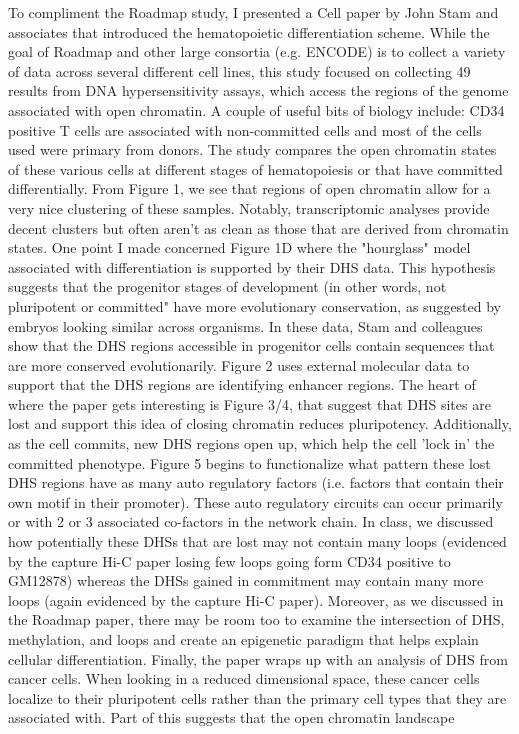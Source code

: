 \documentclass[12pt]{article}
\begin{document}
\begin{addmargin}[6.5mm]{4mm}  
To compliment the Roadmap study, I presented a Cell paper by John Stam and associates that introduced the hematopoietic differentiation scheme. While the goal of Roadmap and other large consortia (e.g. ENCODE) is to collect a variety of data across several different cell lines, this study focused on collecting 49 results from DNA hypersensitivity assays, which access the regions of the genome associated with open chromatin. A couple of useful bits of biology include: CD34 positive T cells are associated with non-committed cells and most of the cells used were primary from donors. The study compares the open chromatin states of these various cells at different stages of hematopoiesis or that have committed differentially. From Figure 1, we see that regions of open chromatin allow for a very nice clustering of these samples. Notably, transcriptomic analyses provide decent clusters but often aren't as clean as those that are derived from chromatin states.  \newline \newline One point I made concerned Figure 1D where the "hourglass" model associated with differentiation is supported by their DHS data. This hypothesis suggests that the progenitor stages of development (in other words, not pluripotent or committed" have more evolutionary conservation, as suggested by embryos looking similar across organisms. In these data, Stam and colleagues show that the DHS regions accessible in progenitor cells contain sequences that are more conserved evolutionarily. Figure 2 uses external molecular data to support that the DHS regions are identifying enhancer regions. \newline \newline The heart of where the paper gets interesting is Figure 3/4, that suggest that DHS sites are lost and support this idea of closing chromatin reduces pluripotency. Additionally, as the cell commits, new DHS regions open up, which help the cell 'lock in' the committed phenotype. Figure 5 begins to functionalize what pattern these lost DHS regions have as many auto regulatory factors (i.e. factors that contain their own motif in their promoter). These auto regulatory circuits can occur primarily or with 2 or 3 associated co-factors in the network chain. In class, we discussed how potentially these DHSs that are lost may not contain many loops (evidenced by the capture Hi-C paper losing few loops going form CD34 positive to GM12878) whereas the DHSs gained in commitment may contain many more loops (again evidenced by the capture Hi-C paper). Moreover, as we discussed in the Roadmap paper, there may be room too to examine the intersection of DHS, methylation, and loops and create an epigenetic paradigm that helps explain cellular differentiation. \newline \newline Finally, the paper wraps up with an analysis of DHS from cancer cells. When looking in a reduced dimensional space, these cancer cells localize to their pluripotent cells rather than the primary cell types that they are associated with. Part of this suggests that the open chromatin landscape 
\end{addmargin}
\end{document}

